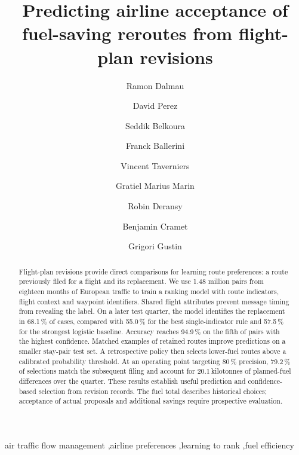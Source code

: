 \documentclass[preprint,authoryear,12pt]{elsarticle}
\begin{document}
\begin{frontmatter}

\title{Predicting airline acceptance of fuel-saving reroutes from
flight-plan revisions}

\author[ih]{Ramon Dalmau}
\author[muac]{David Perez}
\author[muac]{Seddik Belkoura}
\author[ih]{Franck Ballerini}
\author[muac]{Vincent Taverniers}
\author[muac]{Gratiel Marius Marin}
\author[ih]{Robin Deransy}
\author[hq]{Benjamin Cramet}
\author[hq]{Grigori Gustin}

\begin{abstract}
Flight-plan revisions provide direct comparisons for learning route
preferences: a route previously filed for a flight and its replacement.
We use 1.48 million pairs from eighteen months of European traffic to
train a ranking model with route indicators, flight context and waypoint
identifiers. Shared flight attributes prevent message timing from
revealing the label. On a later test quarter, the model identifies the
replacement in 68.1\,\% of cases, compared with 55.0\,\% for the best
single-indicator rule and 57.5\,\% for the strongest logistic baseline.
Accuracy reaches 94.9\,\% on the fifth of pairs with the highest
confidence. Matched examples of retained routes improve predictions on
a smaller stay-pair test set. A retrospective policy then selects
lower-fuel routes above a calibrated probability threshold. At an
operating point targeting 80\,\% precision, 79.2\,\% of selections
match the subsequent filing and account for 20.1\,kilotonnes of
planned-fuel differences over the quarter. These results establish
useful prediction and confidence-based selection from revision records.
The fuel total describes historical choices; acceptance of actual
proposals and additional savings require prospective evaluation.
\end{abstract}

\begin{keyword}
air traffic flow management \sep airline preferences \sep learning to
rank \sep fuel efficiency
\end{keyword}

\end{frontmatter}
\end{document}
